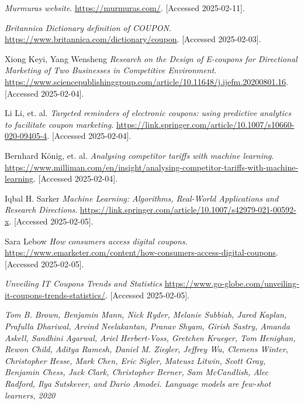 \documentclass[licencjacka,en]{pracamgr}
\begin{document}
\begin{thebibliography}{99}

\raggedright

\textit{Murmuras website}.  
\url{https://murmuras.com/}.  
[Accessed 2025-02-11].

\textit{Britannica Dictionary definition of COUPON}.
\url{https://www.britannica.com/dictionary/coupon}.
[Accessed 2025-02-03].


Xiong Keyi, Yang Wensheng
\textit{Research on the Design of E-coupons for Directional Marketing of Two Businesses in Competitive Environment}.
\url{https://www.sciencepublishinggroup.com/article/10.11648/j.ijefm.20200801.16}.
[Accessed 2025-02-04].

Li Li, et. al.
\textit{Targeted reminders of electronic coupons: using predictive analytics to facilitate coupon marketing}.
\url{https://link.springer.com/article/10.1007/s10660-020-09405-4}.
[Accessed 2025-02-04].

Bernhard König, et. al.
\textit{Analysing competitor tariffs with machine learning}.
\url{https://www.milliman.com/en/insight/analysing-competitor-tariffs-with-machine-learning}.
[Accessed 2025-02-04].

Iqbal H. Sarker
\textit{Machine Learning: Algorithms, Real-World Applications and Research Directions}.
\url{https://link.springer.com/article/10.1007/s42979-021-00592-x}.
[Accessed 2025-02-05].

Sara Lebow
\textit{How consumers access digital coupons}.
\url{https://www.emarketer.com/content/how-consumers-access-digital-coupons}.
[Accessed 2025-02-05].

\textit{Unveiling IT Coupons Trends and Statistics}
\url{https://www.go-globe.com/unveiling-it-coupons-trends-statistics/}.
[Accessed 2025-02-05].

\textit{Tom B. Brown, Benjamin Mann, Nick Ryder, Melanie Subbiah, Jared
Kaplan, Prafulla Dhariwal, Arvind Neelakantan, Pranav Shyam, Girish
Sastry, Amanda Askell, Sandhini Agarwal, Ariel Herbert-Voss, Gretchen
Krueger, Tom Henighan, Rewon Child, Aditya Ramesh, Daniel M.
Ziegler, Jeffrey Wu, Clemens Winter, Christopher Hesse, Mark Chen,
Eric Sigler, Mateusz Litwin, Scott Gray, Benjamin Chess, Jack Clark,
Christopher Berner, Sam McCandlish, Alec Radford, Ilya Sutskever, and
Dario Amodei. Language models are few-shot learners, 2020}


\end{thebibliography}
\end{document}
